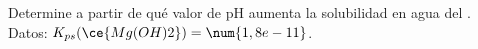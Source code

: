 Determine a partir de qué valor de pH aumenta la solubilidad en agua del .\\
Datos: $K_{ps}(\ce{Mg(OH)2}) = \num{1,8e-11}$.

